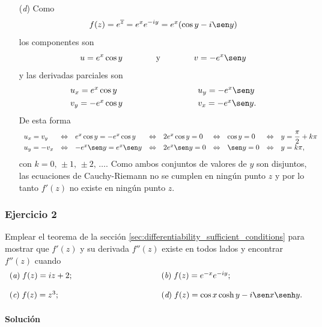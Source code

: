 \documentclass[a4paper]{report}
\begin{document}
\begin{enumerate}
 \item[(\textit{d})] Como
 \[
  f(z)=e^{\overline{z}}=e^xe^{-iy}=e^x(\cos y-i\sen y)
 \]
 los componentes son 
 \[
  u=e^x\cos y
  \qquad\qquad\textrm{y}\qquad\qquad
  v=-e^x\sen y
 \]
 y las derivadas parciales son
 \[
 \begin{array}{ll}
  u_x=e^x\cos y\qquad\qquad\qquad\qquad&u_y=-e^x\sen y\\[\smallskipamount]
  v_y=-e^x\cos y\qquad\qquad\qquad\qquad&v_x=-e^x\sen y.
 \end{array}
 \]
 De esta forma
 \[
 \begin{array}{lllllllll}
  u_x=v_y&\Leftrightarrow&e^x\cos y=-e^x\cos y&\Leftrightarrow&2e^x\cos y=0&\Leftrightarrow&\cos y=0&\Leftrightarrow&y=\dfrac{\pi}{2}+k\pi\\[\smallskipamount]
  u_y=-v_x&\Leftrightarrow&-e^x\sen y=e^x\sen y&\Leftrightarrow&2e^x\sen y=0&\Leftrightarrow&\sen y=0&\Leftrightarrow&y=k\pi,
 \end{array}
 \] 
 con \(k=0,\,\pm1,\,\pm2,\,\dots\).
 Como ambos conjuntos de valores de \(y\) son disjuntos, las ecuaciones de Cauchy-Riemann no se cumplen en ningún punto \(z\) y por lo tanto \(f'(z)\) no existe en ningún punto \(z\).
\end{enumerate}

\subsubsection{Ejercicio 2}

Emplear el teorema de la sección \ref{sec:differentiability_sufficient_conditions} para mostrar que \(f'(z)\) y su derivada \(f''(z)\) existe en todos lados y encontrar \(f''(z)\) cuando
\[
 \begin{array}{ll}
  (\textit{a})\;f(z)=iz+2;\qquad\qquad\qquad\qquad\qquad&(\textit{b})\;f(z)=e^{-x}e^{-iy};\\[\bigskipamount]
  (\textit{c})\;f(z)=z^3;\qquad\qquad\qquad\qquad\qquad&(\textit{d})\;f(z)=\cos x\cosh y-i\sen x\senh y.
 \end{array}
\]

\paragraph{Solución} 
\end{document}
